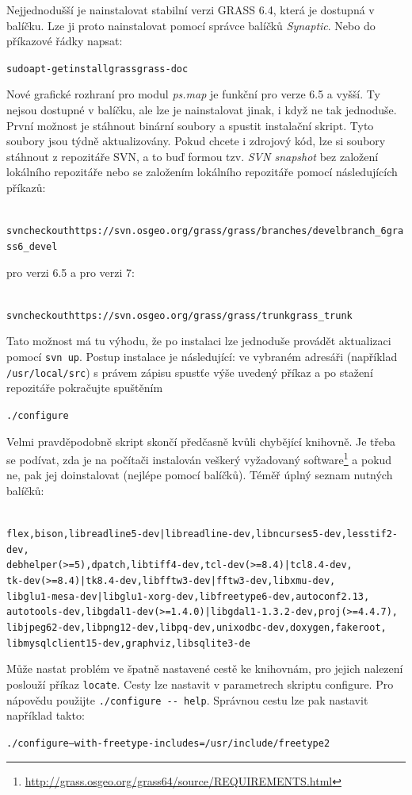 \documentclass[a4paper,12pt,draft]{article}
\newcommand{\modul}[1]{\emph{#1}}
\begin{document}
Nejjednodušší je nainstalovat stabilní verzi GRASS 6.4, která je dostupná v balíčku. Lze ji proto nainstalovat pomocí správce balíčků \emph{Synaptic}. Nebo do příkazové řádky napsat:
\begin{alltt}
{\footnotesize sudo apt-get install grass grass-doc}
\end{alltt}

Nové grafické rozhraní pro modul \modul{ps.map} je funkční pro verze 6.5 a vyšší. Ty nejsou dostupné v balíčku, ale lze je nainstalovat jinak, i když ne tak jednoduše. První možnost je stáhnout binární soubory  a spustit instalační skript. Tyto soubory jsou týdně aktualizovány. Pokud chcete i zdrojový kód, lze si soubory stáhnout z repozitáře SVN, a to buď formou tzv. \emph{SVN snapshot} bez založení lokálního repozitáře nebo se založením lokálního repozitáře pomocí následujících příkazů:
\begin{alltt}
{\footnotesize
svn checkout https://svn.osgeo.org/grass/grass/branches/develbranch_6 grass6_devel}
\end{alltt}
pro verzi 6.5 a pro verzi 7:
\begin{alltt}
{\footnotesize
svn checkout https://svn.osgeo.org/grass/grass/trunk grass_trunk}
\end{alltt}
Tato možnost má tu výhodu, že po instalaci lze jednoduše provádět aktualizaci pomocí \verb|svn up|. Postup instalace je následující: ve vybraném adresáři (například \verb|/usr/local/src|) s právem zápisu spustťe výše uvedený příkaz a po stažení repozitáře pokračujte spuštěním
\begin{alltt}
{\footnotesize ./configure}
\end{alltt}
Velmi pravděpodobně skript skončí předčasně kvůli chybějící knihovně. Je třeba se podívat, zda je na počítači instalován veškerý vyžadovaný software\footnote{\url{http://grass.osgeo.org/grass64/source/REQUIREMENTS.html}} a pokud ne, pak jej doinstalovat (nejlépe pomocí balíčků). Téměř úplný seznam nutných balíčků:
\begin{alltt}
{\footnotesize
flex, bison, libreadline5-dev | libreadline-dev, libncurses5-dev, lesstif2-dev, 
debhelper (>= 5), dpatch, libtiff4-dev, tcl-dev (>= 8.4) | tcl8.4-dev, 
tk-dev (>= 8.4) | tk8.4-dev, libfftw3-dev|fftw3-dev, libxmu-dev, 
libglu1-mesa-dev | libglu1-xorg-dev, libfreetype6-dev, autoconf2.13, 
autotools-dev, libgdal1-dev (>=1.4.0) | libgdal1-1.3.2-dev, proj (>= 4.4.7),
libjpeg62-dev, libpng12-dev, libpq-dev, unixodbc-dev, doxygen, fakeroot, 
libmysqlclient15-dev, graphviz, libsqlite3-de
}
\end{alltt}
Může nastat problém ve špatně nastavené cestě ke knihovnám, pro jejich nalezení poslouží příkaz \verb|locate|. Cesty lze nastavit v parametrech skriptu configure. Pro nápovědu použijte \verb|./configure -- help|. Správnou cestu lze pak nastavit například takto:
\begin{alltt}
{\footnotesize./configure --with-freetype-includes=/usr/include/freetype2   }
\end{alltt}
\end{document}
